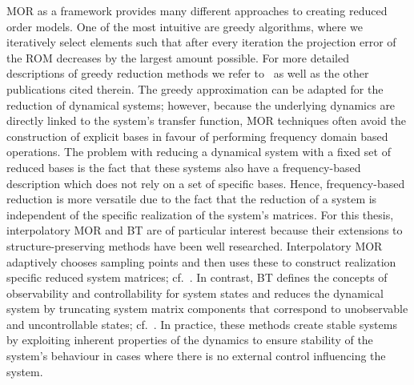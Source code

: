 \ac{MOR} as a framework provides many different approaches to creating reduced order models.
One of the most intuitive are greedy algorithms, where we iteratively select elements such that after every iteration the projection error of the \ac{ROM} decreases by the largest amount possible.
For more detailed descriptions of greedy reduction methods we refer to~\cite{Grepl2005, Rozza2008, Buffa2012} as well as the other publications cited therein.
The greedy approximation can be adapted for the reduction of dynamical systems; however, because the underlying dynamics are directly linked to the system's transfer function, \ac{MOR} techniques often avoid the construction of explicit bases in favour of performing frequency domain based operations.
The problem with reducing a dynamical system with a fixed set of reduced bases is the fact that these systems also have a frequency-based description which does not rely on a set of specific bases.
Hence, frequency-based reduction is more versatile due to the fact that the reduction of a system is independent of the specific realization of the system's matrices.
For this thesis, interpolatory \ac{MOR} and \ac{BT} are of particular interest because their extensions to structure-preserving methods have been well researched.
Interpolatory \ac{MOR} adaptively chooses sampling points and then uses these to construct realization specific reduced system matrices; cf.~\cite{Antoulas2005, Gugercin2009, Beattie2017}.
In contrast, \ac{BT} defines the concepts of observability and controllability for system states and reduces the dynamical system by truncating system matrix components that correspond to unobservable and uncontrollable states; cf.~\cite{Moore1981, Enns1984, Antoulas2005, Gugercin2007, BB2017}.
In practice, these methods create stable systems by exploiting inherent properties of the dynamics to ensure stability of the system's behaviour in cases where there is no external control influencing the system.

